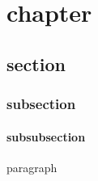 \def\CLASS{scrbook}


\pagestyle{empty}


\showoutput

\tableofcontents

\chapter{chapter}
\section{section}
\subsection{subsection}
\subsubsection{subsubsection}

paragraph



